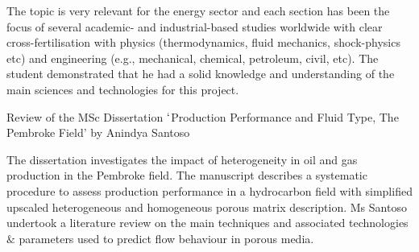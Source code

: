 \documentclass[14pt,twoside]{report}
\begin{document}
The topic is very relevant for the energy sector and each section has been the focus of several academic- and industrial-based studies worldwide with clear cross-fertilisation with physics (thermodynamics, fluid mechanics, shock-physics etc) and engineering (e.g., mechanical, chemical, petroleum, civil, etc). The student demonstrated that he had a solid knowledge and understanding of the main sciences and technologies for this project.



\clearpage




\bigskip

\begin{center}
{\Large Review of the MSc Dissertation $\lq$Production Performance and Fluid Type, The Pembroke Field' by Anindya Santoso}
\end{center}

\medskip

The dissertation investigates the impact of heterogeneity in oil and gas production in the Pembroke field. The manuscript describes a systematic procedure to assess production performance in a hydrocarbon field with simplified upscaled heterogeneous and homogeneous porous matrix description. Ms Santoso undertook a literature review on the main techniques and associated technologies $\&$ parameters used to predict flow behaviour in porous media.
\end{document}
